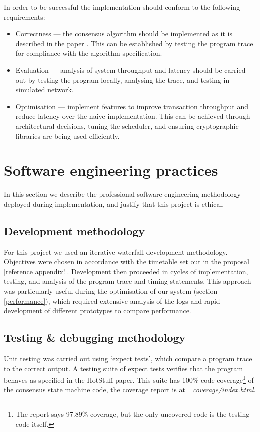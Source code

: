 In order to be successful the implementation should conform to the following requirements:
\begin{itemize}
	\item Correctness --- the consensus algorithm should be implemented as it is described in the paper \cite{yinHotStuffBFTConsensus2019}. This can be established by testing the program trace for compliance with the algorithm specification.
	\item Evaluation --- analysis of system throughput and latency should be carried out by testing the program locally, analysing the trace, and testing in simulated network.
	\item Optimisation --- implement features to improve transaction throughput and reduce latency over the naive implementation. This can be achieved through architectural decisions, tuning the scheduler, and ensuring cryptographic libraries are being used efficiently.
\end{itemize}

\section{Software engineering practices} \label{softwareeng}

In this section we describe the professional software engineering methodology deployed during implementation, and justify that this project is ethical.

\subsection{Development methodology} \label{devmethods}

For this project we used an iterative waterfall development methodology. Objectives were chosen in accordance with the timetable set out in the proposal [reference appendix!]. Development then proceeded in cycles of implementation, testing, and analysis of the program trace and timing statements. This approach was particularly useful during the optimisation of our system (section \ref{performance}), which required extensive analysis of the logs and rapid development of different prototypes to compare performance.

\subsection{Testing \& debugging methodology} \label{testing}

Unit testing was carried out using `expect tests', which compare a program trace to the correct output. A testing suite of expect tests verifies that the program behaves as specified in the HotStuff paper. This suite has 100\% code coverage\footnote{The report says 97.89\% coverage, but the only uncovered code is the testing code itself.} of the consensus state machine code, the coverage report is at \textit{\_coverage/index.html}.

